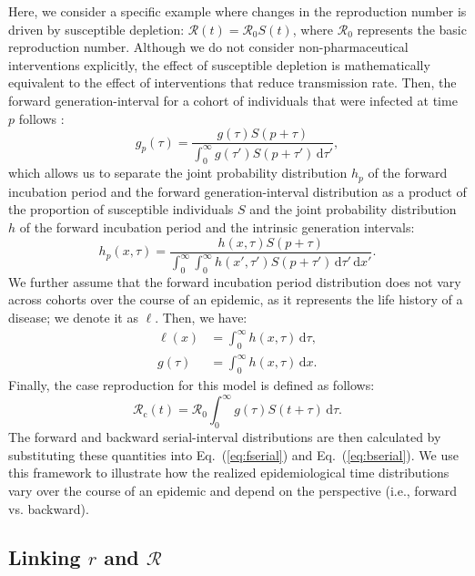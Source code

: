 \documentclass[12pt]{article}
\newcommand{\eref}[1]{Eq.~(\ref{eq:#1})}
\newcommand{\Rx}[1]{\ensuremath{{\mathcal R}_{#1}}\xspace}
\newcommand{\Ro}{\Rx{0}}
\newcommand{\Rc}{\Rx{\mathrm{c}}}
\newcommand{\RR}{\ensuremath{{\mathcal R}}\xspace}
\newcommand{\dd}[1]{\ensuremath{\, \mathrm{d}#1}}
\newcommand{\dtau}{\dd{\tau}}
\newcommand{\dx}{\dd{x}}
\newcommand{\psymp}{\ensuremath{p}} %
\newcommand{\gdist}{g} %
\newcommand{\idist}{\ell} %
\begin{document}
Here, we consider a specific example where changes in the reproduction number is driven by susceptible depletion: $\RR(t) = \Ro S(t)$, where \Ro represents the basic reproduction number.
Although we do not consider non-pharmaceutical interventions explicitly, the effect of susceptible depletion is mathematically equivalent to the effect of interventions that reduce transmission rate.
Then, the forward generation-interval for a cohort of individuals that were infected at time $\psymp$ follows \citep{champredon2015intrinsic}:
\begin{equation}
\gdist_\psymp (\tau) = \frac{ \gdist(\tau) S(\psymp + \tau)}{\int_0^\infty \gdist(\tau') S(\psymp + \tau') \dtau'},
\end{equation}
which allows us to separate the joint probability distribution $h_\psymp$ of the forward incubation period and the forward generation-interval distribution as a product of the proportion of susceptible individuals $S$ and the joint probability distribution $h$ of the forward incubation period and the intrinsic generation intervals:
\begin{equation}
h_\psymp (x, \tau) = \frac{h(x, \tau) S(\psymp + \tau)}{\int_0^\infty \int_0^\infty h(x', \tau') S(\psymp + \tau') \dtau' \dx'}.
\end{equation}
We further assume that the forward incubation period distribution does
not vary across cohorts over the course of an epidemic, as it
represents the life history of a disease; we denote it as $\idist$.
Then, we have:
\begin{align}
\idist(x) &= \int_0^\infty h(x, \tau) \dtau\nonumber,\\
\gdist(\tau) &= \int_0^\infty h(x, \tau) \dx.
\label{eq:marginal}
\end{align}
Finally, the case reproduction for this model is defined as follows:
\begin{equation}
\Rc(t) = \Ro \int_0^\infty \gdist(\tau) S(t+\tau) \dtau.
\end{equation}
The forward and backward serial-interval distributions are then calculated by substituting these quantities into \eref{fserial} and \eref{bserial}.
We use this framework to illustrate how the realized epidemiological time distributions vary over the course of an epidemic and depend on the perspective (i.e., forward vs. backward).

\subsection{Linking $r$ and \RR}
\end{document}
